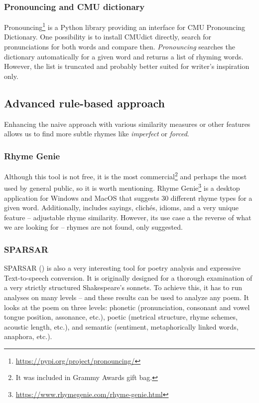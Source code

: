\subsubsection*{Pronouncing and CMU dictionary}
Pronouncing\footnote{\url{https://pypi.org/project/pronouncing/}} is a Python library providing an interface for CMU Pronouncing Dictionary. One possibility is to install CMUdict directly, search for pronunciations for both words and compare then. \textit{Pronouncing} searches the dictionary automatically for a given word and returns a list of rhyming words. However, the list is truncated and probably better suited for writer's inspiration only.


\subsection{Advanced rule-based approach}
Enhancing the naive approach with various similarity measures or other features allows us to find more subtle rhymes like \textit{imperfect} or \textit{forced}.

\subsubsection*{Rhyme Genie}
Although this tool is not free, it is the most commercial\footnote{It was included in Grammy Awards gift bag.}
and perhaps the most used by general public, so it is worth mentioning. Rhyme Genie\footnote{\url{https://www.rhymegenie.com/rhyme-genie.html}} is a desktop application for Windows and MacOS that suggests 30 different rhyme types for a given word. Additionally,  includes sayings, clichés, idioms, and a very unique feature -- adjustable rhyme similarity. However, its use case a the
reverse of what we are looking for -- rhymes are not found, only suggested.

\subsubsection*{SPARSAR}
SPARSAR (\cite{Delmonte2014}) is also a very interesting tool for poetry analysis and expressive Text-to-speech conversion. It is originally designed for a thorough examination of a very strictly structured Shakespeare's sonnets. To achieve this, it has to run analyses on many levels -- and these results can be used to analyze any poem. It looks at the poem on three levels: phonetic (pronunciation, consonant and vowel tongue position, assonance, etc.), poetic (metrical structure, rhyme schemes, acoustic length, etc.), and semantic (sentiment, metaphorically linked words, anaphora, etc.).

